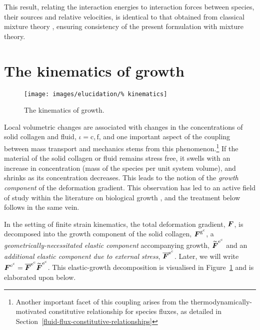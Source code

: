 This result, relating the interaction energies to interaction
forces between species, their sources and relative velocities, is
identical to that obtained from classical mixture theory
\citep{TruesdellNoll:65}, ensuring consistency of the present
formulation with mixture theory.

\section{The kinematics of growth}
\label{kinematics-of-growth}

\begin{figure}[ht]
  \centering
  \texttt{[image: images/elucidation/\%
    kinematics]}
  \caption{The kinematics of growth.}
  \label{continuum-potato-growth-kinematics}
\end{figure}

Local volumetric changes are associated with changes in the
concentrations of solid collagen and fluid, $\iota = \mathrm{c,f}$,
and one important aspect of the coupling between mass transport and
mechanics stems from this phenomenon.\footnote{Another important facet
  of this coupling arises from the thermodynamically-motivated
  constitutive relationship for species fluxes, as detailed in
  Section~\ref{fluid-flux-constitutive-relationships}} If the material
of the solid collagen or fluid remains stress free, it swells with an
increase in concentration (mass of the species per unit system
volume), and shrinks as its concentration decreases. This leads to the
notion of the \emph{growth component} of the deformation
gradient. This observation has led to an active field of study within
the literature on biological growth \citep{Skalak:81, SkalakHoger:96,
  Klischetal:2001, TaberHumphrey:2001, LubardaHoger:02,
  AmbrosiMollica:2002}, and the treatment below follows in the same
vein.

In the setting of finite strain kinematics, the total deformation
gradient, $\mbox{\boldmath$ F$}$, is decomposed into the growth component of the solid
collagen, $\mbox{\boldmath$ F$}^{\mathrm{g}^\mathrm{c}}$, a
\emph{geometrically-necessitated elastic component} accompanying
growth, $\widetilde{\mbox{\boldmath$ F$}}^{\mathrm{e}^\mathrm{c}}$ and an
\emph{additional elastic component due to external stress},
$\overline{\mbox{\boldmath$ F$}}^{\mathrm{e}^\mathrm{c}}$. Later, we will write
$\mbox{\boldmath$ F$}^{\mathrm{e}^\mathrm{c}} = \overline{\mbox{\boldmath$ F$}}^{\mathrm{e}^\mathrm{c}}
\widetilde{\mbox{\boldmath$ F$}}^{\mathrm{e}^\mathrm{c}}$. This elastic-growth
decomposition is visualised in
Figure~\ref{continuum-potato-growth-kinematics} and is elaborated upon
below.

